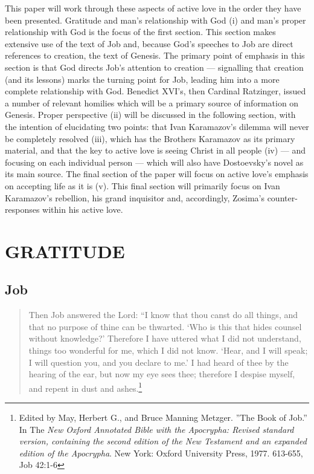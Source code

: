 This paper will work through these aspects of active love in the order they have been presented. Gratitude and man's relationship with God (i) and man's proper relationship with God is the focus of the first section. This section makes extensive use of the text of Job and, because God's speeches to Job are direct references to creation, the text of Genesis. The primary point of emphasis in this section is that God directs Job's attention to creation --- signalling that creation (and its lessons) marks the turning point for Job, leading him into a more complete relationship with God. Benedict XVI's, then Cardinal Ratzinger, issued a number of relevant homilies which will be a primary source of information on Genesis. Proper perspective (ii) will be discussed in the following section, with the intention of elucidating two points: that Ivan Karamazov's dilemma will never be completely resolved (iii), which has the Brothers Karamazov as its primary material, and that the key to active love is seeing Christ in all people (iv) --- and focusing on each individual person --- which will also have Dostoevsky's novel as its main source. The final section of the paper will focus on active love's emphasis on accepting life as it is (v). This final section will primarily focus on Ivan Karamazov's rebellion, his grand inquisitor and, accordingly, Zosima's counter-responses within his active love.

\chapter{GRATITUDE}
	\section{Job}
\begin{quote}
\onehalfspacing
Then Job answered the Lord: ``I know that thou canst do all things, and that no purpose of thine can be thwarted. `Who is this that hides counsel without knowledge?' Therefore I have uttered what I did not understand, things too wonderful for me, which I did not know. `Hear, and I will speak; I will question you, and you declare to me.' I had heard of thee by the hearing of the ear, but now my eye sees thee; therefore I despise myself, and repent in dust and ashes.\footnote{Edited by May, Herbert G., and Bruce Manning Metzger. ''The Book of Job.'' In The \emph{New Oxford Annotated Bible with the Apocrypha: Revised standard version, containing the second edition of the New Testament and an expanded edition of the Apocrypha}. New York: Oxford University Press, 1977. 613-655, Job 42:1-6} 
\end{quote}



